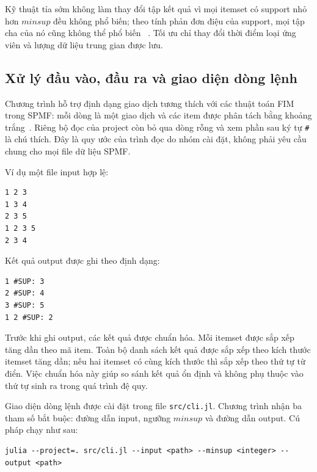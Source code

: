 Kỹ thuật tỉa sớm không làm thay đổi tập kết quả vì mọi itemset có support
nhỏ hơn $\mathit{minsup}$ đều không phổ biến; theo tính phản đơn điệu của
support, mọi tập cha của nó cũng không thể phổ biến
~\cite{agrawal1994fast,han2011datamining}. Tối ưu chỉ thay đổi thời điểm loại
ứng viên và lượng dữ liệu trung gian được lưu.

\subsection{Xử lý đầu vào, đầu ra và giao diện dòng lệnh}
\label{subsec:io-cli}

Chương trình hỗ trợ định dạng giao dịch tương thích với các thuật toán FIM
trong SPMF: mỗi dòng là một giao dịch và các item được phân tách bằng khoảng
trắng~\cite{fournier2014spmf,spmfwebsite}. Riêng bộ đọc của project còn bỏ qua
dòng rỗng và xem phần sau ký tự \texttt{\#} là chú thích. Đây là quy ước của
trình đọc do nhóm cài đặt, không phải yêu cầu chung cho mọi file dữ liệu SPMF.

Ví dụ một file input hợp lệ:

\begin{lstlisting}[caption={Ví dụ input theo định dạng SPMF}, label={lst:spmf-input}]
1 2 3
1 3 4
2 3 5
1 2 3 5
2 3 4
\end{lstlisting}

Kết quả output được ghi theo định dạng:

\begin{lstlisting}[caption={Ví dụ output theo định dạng SPMF}, label={lst:spmf-output}]
1 #SUP: 3
2 #SUP: 4
3 #SUP: 5
1 2 #SUP: 2
\end{lstlisting}

Trước khi ghi output, các kết quả được chuẩn hóa. Mỗi itemset được sắp xếp tăng dần theo mã item. Toàn bộ danh sách kết quả được sắp xếp theo kích thước itemset tăng dần; nếu hai itemset có cùng kích thước thì sắp xếp theo thứ tự từ điển. Việc chuẩn hóa này giúp so sánh kết quả ổn định và không phụ thuộc vào thứ tự sinh ra trong quá trình đệ quy.

Giao diện dòng lệnh được cài đặt trong file \texttt{src/cli.jl}. Chương trình nhận ba tham số bắt buộc: đường dẫn input, ngưỡng $\mathit{minsup}$ và đường dẫn output. Cú pháp chạy như sau:

\begin{lstlisting}[caption={Cú pháp chạy chương trình}, label={lst:cli-usage}]
julia --project=. src/cli.jl --input <path> --minsup <integer> --output <path>
\end{lstlisting}

